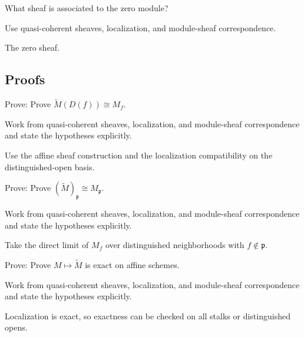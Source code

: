 \begin{exercise}\label{exr:vi33-expand-05}
What sheaf is associated to the zero module?
\end{exercise}
\begin{hint}
Use quasi-coherent sheaves, localization, and module-sheaf correspondence.
\end{hint}
\begin{solution}
The zero sheaf.
\end{solution}

\subsection*{Proofs}

\begin{exercise}\label{exr:vi33-expand-06}
Prove: Prove $\widetilde M(D(f))\cong M_f$.
\end{exercise}
\begin{hint}
Work from quasi-coherent sheaves, localization, and module-sheaf correspondence and state the hypotheses explicitly.
\end{hint}
\begin{solution}
Use the affine sheaf construction and the localization compatibility on the distinguished-open basis.
\end{solution}

\begin{exercise}\label{exr:vi33-expand-07}
Prove: Prove $(\widetilde M)_{\mathfrak p}\cong M_{\mathfrak p}$.
\end{exercise}
\begin{hint}
Work from quasi-coherent sheaves, localization, and module-sheaf correspondence and state the hypotheses explicitly.
\end{hint}
\begin{solution}
Take the direct limit of $M_f$ over distinguished neighborhoods with $f\notin\mathfrak p$.
\end{solution}

\begin{exercise}[Exactness]\label{exr:vi33-expand-08}
Prove: Prove $M\mapsto\widetilde M$ is exact on affine schemes.
\end{exercise}
\begin{hint}
Work from quasi-coherent sheaves, localization, and module-sheaf correspondence and state the hypotheses explicitly.
\end{hint}
\begin{solution}
Localization is exact, so exactness can be checked on all stalks or distinguished opens.
\end{solution}

